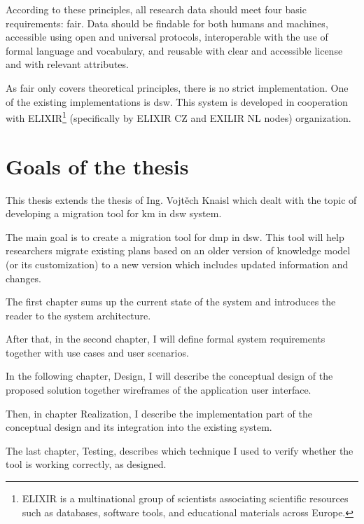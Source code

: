According to these principles, all research data should meet four basic requirements: \gls{fair}.
Data should be findable for both humans and machines, accessible using open and universal protocols, interoperable with the use of formal language and vocabulary, and reusable with clear and accessible license and with relevant attributes.

As \gls{fair} only covers theoretical principles, there is no strict implementation.
One of the existing implementations is \gls{dsw}.
This system is developed in cooperation with ELIXIR\footnote{ELIXIR is a multinational group of scientists associating scientific resources such as databases, software tools, and educational materials across Europe.} (specifically by ELIXIR CZ and EXILIR NL nodes) organization.

\section*{Goals of the thesis}

This thesis extends the thesis of Ing. Vojtěch Knaisl which dealt with the topic of developing a migration tool for \gls{km} in \gls{dsw} system.

The main goal is to create a migration tool for \gls{dmp} in \gls{dsw}.
This tool will help researchers migrate existing plans based on an older version of knowledge model (or its customization) to a new version which includes updated information and changes.

\medskip

The first chapter sums up the current state of the system and introduces the reader to the system architecture.

After that, in the second chapter, I will define formal system requirements together with use cases and user scenarios.

In the following chapter, Design, I will describe the conceptual design of the proposed solution together wireframes of the application user interface.

Then, in chapter Realization, I describe the implementation part of the conceptual design and its integration into the existing system.

The last chapter, Testing, describes which technique I used to verify whether the tool is working correctly, as designed.
